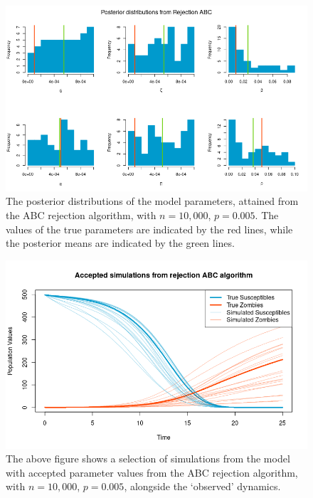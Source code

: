 \documentclass[]{article}
\begin{document}
\begin{figure}[H]
	\centering
	\includegraphics[width=1\linewidth]{../Figures/rejection_posteriors}
	\caption{The posterior distributions of the model parameters, attained from the ABC rejection algorithm, with $n=10,000$, $p=0.005$. The values of the true parameters are indicated by the red lines, while the posterior means are indicated by the green lines.}
	\label{rej_abc_posteriors}
\end{figure}

\begin{figure}[H]
\centering
\includegraphics[width=0.8\linewidth]{../Figures/rej_ABC_simulations}
\caption{The above figure shows a selection of simulations from the model with accepted parameter values from the ABC rejection algorithm, with $n=10,000$, $p=0.005$, alongside the `observed' dynamics.}
\label{rej_abc_acc_simulations}
\end{figure}
\end{document}
